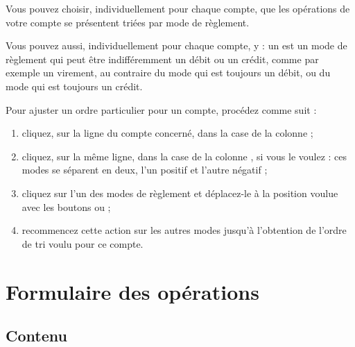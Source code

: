 Vous pouvez choisir, individuellement pour chaque compte, que les opérations de votre compte se présentent triées par mode de règlement.

Vous pouvez aussi, individuellement pour chaque compte, y  : un  est un mode de règlement qui peut être indifféremment un débit ou un crédit, comme par exemple un virement, au contraire du mode  qui est toujours un débit, ou du mode   qui est toujours un crédit. 

Pour ajuster un ordre particulier pour un compte, procédez comme suit :
\begin{enumerate}
	\item cliquez, sur la ligne du compte concerné, dans la case de la colonne  ;
	\item cliquez, sur la même ligne, dans la case de la colonne , si vous le voulez : ces modes se séparent en deux, l'un positif et l'autre négatif ;
	\item cliquez sur l'un des modes de règlement et déplacez-le à la position voulue avec les boutons  ou  ;
	\item recommencez cette action sur les autres modes jusqu'à l'obtention de l'ordre de \gls{tri} voulu pour ce compte.
\end{enumerate}


\section{Formulaire des opérations\label{setup-form}}
 

\subsection{Contenu\label{setup-form-content}}

